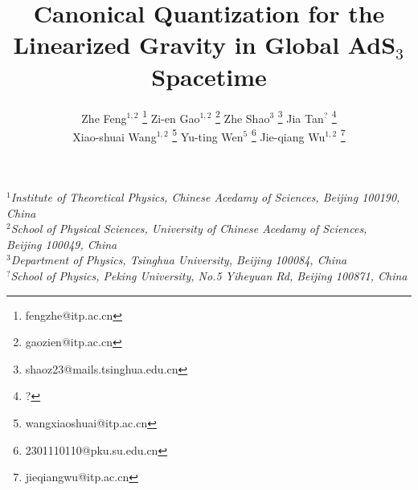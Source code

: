 \title{\textbf{Canonical Quantization for the Linearized Gravity in Global AdS$_3$ Spacetime}}

\author{
Zhe Feng${}^{1,2}$ \footnote{fengzhe@itp.ac.cn}
Zi-en Gao${}^{1,2}$ \footnote{gaozien@itp.ac.cn}
Zhe Shao${}^{3}$ \footnote{shaoz23@mails.tsinghua.edu.cn}
Jia Tan${}^{?}$ \footnote{?} \\
Xiao-shuai Wang${}^{1,2}$ \footnote{wangxiaoshuai@itp.ac.cn}
Yu-ting Wen${}^{5}$ \footnote{2301110110@pku.su.edu.cn}
Jie-qiang Wu${}^{1,2}$ \footnote{jieqiangwu@itp.ac.cn}
}

\date{}

\maketitle

\begin{center}
{\it
$^{1}$Institute of Theoretical Physics, Chinese Acedamy of Sciences, Beijing 100190, China \\
$^{2}$School of Physical Sciences, University of Chinese Acedamy of Sciences, \\ Beijing 100049, China\\
$^{3}$Department of Physics, Tsinghua University, Beijing 100084, China\\
$^{?}$School of Physics, Peking University, No.5 Yiheyuan Rd, Beijing 100871, China
}
\end{center}

\vspace{10mm}
